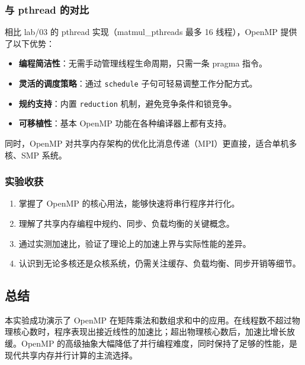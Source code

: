 \documentclass[12pt,a4paper]{ctexart}
\begin{document}
\subsubsection{与 pthread 的对比}
相比 lab/03 的 pthread 实现（matmul\_pthreads 最多 16 线程），OpenMP 提供了以下优势：
\begin{itemize}
  \item \textbf{编程简洁性}：无需手动管理线程生命周期，只需一条 pragma 指令。
  \item \textbf{灵活的调度策略}：通过 \texttt{schedule} 子句可轻易调整工作分配方式。
  \item \textbf{规约支持}：内置 \texttt{reduction} 机制，避免竞争条件和锁竞争。
  \item \textbf{可移植性}：基本 OpenMP 功能在各种编译器上都有支持。
\end{itemize}

同时，OpenMP 对共享内存架构的优化比消息传递（MPI）更直接，适合单机多核、SMP 系统。

\subsubsection{实验收获}
\begin{enumerate}[itemsep=0.3em]
  \item 掌握了 OpenMP 的核心用法，能够快速将串行程序并行化。
  \item 理解了共享内存编程中规约、同步、负载均衡的关键概念。
  \item 通过实测加速比，验证了理论上的加速上界与实际性能的差异。
  \item 认识到无论多核还是众核系统，仍需关注缓存、负载均衡、同步开销等细节。
\end{enumerate}

\subsection*{总结}
本实验成功演示了 OpenMP 在矩阵乘法和数组求和中的应用。在线程数不超过物理核心数时，程序表现出接近线性的加速比；超出物理核心数后，加速比增长放缓。OpenMP 的高级抽象大幅降低了并行编程难度，同时保持了足够的性能，是现代共享内存并行计算的主流选择。
\end{document}
